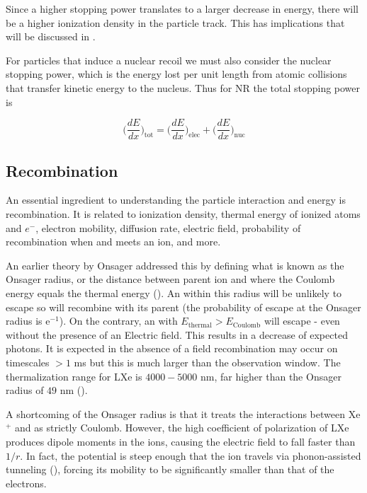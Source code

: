Since a higher stopping power translates to a larger decrease in energy, there will be a higher ionization density in the particle
track.  This has implications that will be discussed in \secref{}.

For particles that induce a nuclear recoil we must also consider the nuclear stopping power, which is the energy lost per unit length from
atomic collisions that transfer kinetic energy to the nucleus.  Thus for NR the total stopping power is

\begin{equation}
\bigg( \frac{dE}{dx} \bigg)_{\mathrm{tot}} = \bigg( \frac{dE}{dx} \bigg)_{\mathrm{elec}} + \bigg( \frac{dE}{dx} \bigg)_{\mathrm{nuc}}
\end{equation}



\subsection{Recombination}
\label{subsec:recombination}
An essential ingredient to understanding the particle interaction and energy is recombination.  It is related to ionization density,
thermal energy of ionized atoms and $e^{-}$, electron mobility, diffusion rate, electric field, probability of recombination when
and \electron meets an ion, and more.

An earlier theory by Onsager addressed this by defining what is known
as the Onsager radius, or the distance between parent
ion and \electron where the Coulomb energy equals the \electron thermal energy ().  An \electron within this
radius will be unlikely to
escape so will recombine with its parent (the probability of escape at the Onsager radius is e$^{-1}$).  On the contrary, an \electron
with $E_{\mathrm{thermal}} > E_{\mathrm{Coulomb}}$ will escape - even without the presence of an Electric field.  This results in a decrease of expected
photons.  It is expected in the absence of a field recombination may occur on timescales $> 1$ ms but this is much larger than the
observation window.  The thermalization range for LXe is $4000-5000$ nm, far higher than the Onsager radius of $49$ nm
().

A shortcoming of the Onsager radius is that it treats the interactions between Xe$^{+}$ and \electron as strictly Coulomb.  However,
the high coefficient of polarization of LXe produces dipole moments in the ions, causing the electric field to fall faster than
$1/r$.  In fact, the potential is steep enough that the ion travels via phonon-assisted tunneling (), forcing its
mobility to be significantly smaller than that of the electrons.

